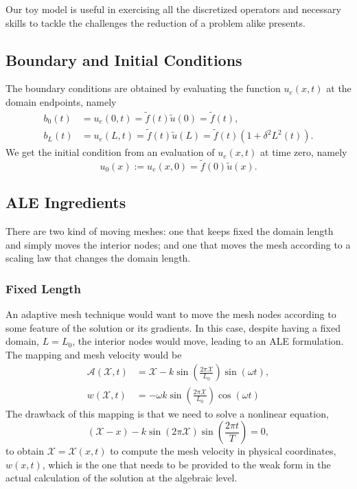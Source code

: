 \documentclass[../../main.tex]{subfiles}
\newcommand{\alemap}{\ensuremath{\mathcal{A}}}
\newcommand{\aleX}{\ensuremath{\mathcal{X}}}
\begin{document}
Our toy model is useful in exercising all the discretized operators and necessary skills to tackle the challenges the reduction of a problem alike presents. 

\subsection{Boundary and Initial Conditions}
The boundary conditions are obtained by evaluating the function $u_e(x,t)$ at the domain endpoints, namely 
\begin{subequations}
    \label{eq:1d_fom_mfp_boundary_conditions}
    \begin{align}
        b_0(t) &= u_e(0,t) = \tilde{f}(t) \tilde{u}(0) = \tilde{f}(t), \\
        b_L(t) &= u_e(L,t) = \tilde{f}(t) \tilde{u}(L) = \tilde{f}(t)\left(1 + \delta^2L^2(t)\right).
    \end{align}
\end{subequations}
We get the initial condition from an evaluation of $u_e(x,t)$ at time zero, namely
\begin{equation}
    u_0(x) := u_e(x,0) = \tilde{f}(0) \tilde{u}(x).
\end{equation}

\subsection{ALE Ingredients}
There are two kind of moving meshes: one that keeps fixed the domain length and simply moves the interior nodes; and one that moves the mesh according to a scaling law that changes the domain length.

\subsubsection{Fixed Length}
An adaptive mesh technique would want to move the mesh nodes according to some feature of the solution or its gradients. 
In this case, despite having a fixed domain, $L=L_0$, the interior nodes would move, leading to an ALE formulation.
The mapping and mesh velocity would be 
\begin{subequations}
    \begin{align}
        \alemap(\aleX, t) &= \aleX - k \sin(\frac{2\pi \aleX}{L_0}) \sin(\omega t), \\
        w(\aleX, t) &= - \omega k \sin(\frac{2\pi \aleX}{L_0}) \cos (\omega t)
    \end{align}
\end{subequations}
The drawback of this mapping is that we need to solve a nonlinear equation,
\begin{equation}
    \left(\aleX -x \right) - k \sin(2\pi \aleX) \sin \left(\frac{2\pi t}{T}\right) = 0,
\end{equation}
to obtain $\aleX = \aleX(x,t)$ to compute the mesh velocity in physical coordinates, $w(x,t)$, which is the one that needs to be provided to the weak form in the actual calculation of the solution at the algebraic level.
\end{document}
